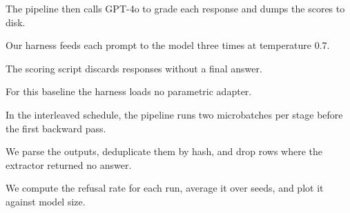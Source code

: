 %


The pipeline then calls GPT-4o to grade each response and dumps the scores to disk.

Our harness feeds each prompt to the model three times at temperature 0.7.

The scoring script discards responses without a final answer.

For this baseline the harness loads no parametric adapter.

In the interleaved schedule, the pipeline runs two microbatches per stage before the first backward pass.


We parse the outputs, deduplicate them by hash, and drop rows where the extractor returned no answer.

We compute the refusal rate for each run, average it over seeds, and plot it against model size.

